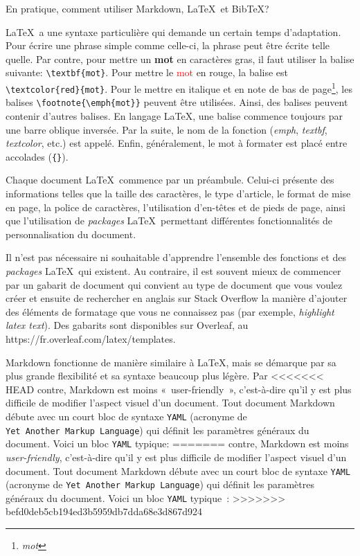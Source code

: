 \documentclass[
  letterpaper,
]{scrbook}
\begin{document}
En pratique, comment utiliser Markdown, \LaTeX~et BibTeX?

\LaTeX~a une syntaxe particulière qui demande un certain temps
d'adaptation. Pour écrire une phrase simple comme celle-ci, la phrase
peut être écrite telle quelle. Par contre, pour mettre un \textbf{mot}
en caractères gras, il faut utiliser la balise suivante:
\texttt{\textbackslash{}textbf\{mot\}}. Pour mettre le
\textcolor{red}{mot} en rouge, la balise est
\texttt{\textbackslash{}textcolor\{red\}\{mot\}}. Pour le mettre en
italique et en note de bas de page\footnote{\emph{mot}}, les balises
\texttt{\textbackslash{}footnote\{\textbackslash{}emph\{mot\}\}} peuvent
être utilisées. Ainsi, des balises peuvent contenir d'autres balises. En
langage \LaTeX, une balise commence toujours par une barre oblique
inversée. Par la suite, le nom de la fonction (\emph{emph},
\emph{textbf}, \emph{textcolor}, etc.) est appelé. Enfin, généralement,
le mot à formater est placé entre accolades (\texttt{\{\}}).

Chaque document \LaTeX~commence par un préambule. Celui-ci présente des
informations telles que la taille des caractères, le type d'article, le
format de mise en page, la police de caractères, l'utilisation
d'en-têtes et de pieds de page, ainsi que l'utilisation de
\emph{packages} \LaTeX~permettant différentes fonctionnalités de
personnalisation du document.

Il n'est pas nécessaire ni souhaitable d'apprendre l'ensemble des
fonctions et des \emph{packages} \LaTeX~qui existent. Au contraire, il
est souvent mieux de commencer par un gabarit de document qui convient
au type de document que vous voulez créer et ensuite de rechercher en
anglais sur Stack Overflow la manière d'ajouter des éléments de
formatage que vous ne connaissez pas (par exemple, \emph{highlight latex
text}). Des gabarits sont disponibles sur Overleaf, au
https://fr.overleaf.com/latex/templates.

Markdown fonctionne de manière similaire à \LaTeX, mais se démarque par
sa plus grande flexibilité et sa syntaxe beaucoup plus légère. Par
<<<<<<< HEAD
contre, Markdown est moins «~user-friendly~», c'est-à-dire qu'il y est
plus difficile de modifier l'aspect visuel d'un document. Tout document
Markdown débute avec un court bloc de syntaxe \texttt{YAML} (acronyme de
\texttt{Yet\ Another\ Markup\ Language}) qui définit les paramètres
généraux du document. Voici un bloc \texttt{YAML} typique:
=======
contre, Markdown est moins \emph{user-friendly}, c'est-à-dire qu'il y
est plus difficile de modifier l'aspect visuel d'un document. Tout
document Markdown débute avec un court bloc de syntaxe \texttt{YAML}
(acronyme de \texttt{Yet\ Another\ Markup\ Language}) qui définit les
paramètres généraux du document. Voici un bloc \texttt{YAML} typique~:
>>>>>>> befd0deb5cb194ed3b5959db7dda68e3d867d924
\end{document}
